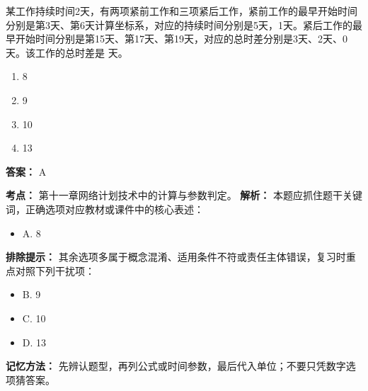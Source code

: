 \documentclass[UTF8,fontset=fandol,11pt]{ctexart}
\begin{document}
\begin{quizbox}[title={第 5 题}]
某工作持续时间2天，有两项紧前工作和三项紧后工作，紧前工作的最早开始时间分别是第3天、第6天计算坐标系，对应的持续时间分别是5天，1天。紧后工作的最早开始时间分别是第15天、第17天、第19天，对应的总时差分别是3天、2天、0天。该工作的总时差是 天。\\
\begin{enumerate}[label=\Alph*.]
\item 8
\item 9
\item 10
\item 13
\end{enumerate}
\textbf{答案：} A
\vspace{0.25em}
\begin{answerbox}[title={考点解析}]
\textbf{考点：} 第十一章网络计划技术中的计算与参数判定。
\textbf{解析：} 本题应抓住题干关键词，正确选项对应教材或课件中的核心表述：
\begin{itemize}
\item A. 8
\end{itemize}
\textbf{排除提示：} 其余选项多属于概念混淆、适用条件不符或责任主体错误，复习时重点对照下列干扰项：
\begin{itemize}
\item B. 9
\item C. 10
\item D. 13
\end{itemize}
\textbf{记忆方法：} 先辨认题型，再列公式或时间参数，最后代入单位；不要只凭数字选项猜答案。
\end{answerbox}
\end{quizbox}

\vspace{0.2em}
\end{document}
